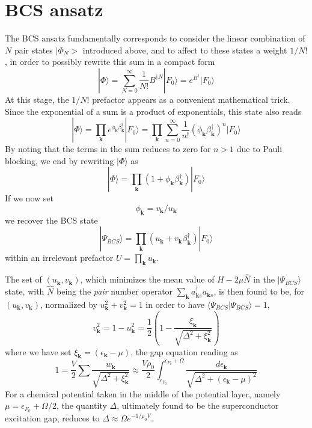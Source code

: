 \documentclass[aps,prb,preprint,groupedaddress,amsmath]{revtex4-1}
\newcommand{\vk}{\ensuremath{\mathbf{k}}}
\newcommand{\dg}{\ensuremath{\dagger}}
\begin{document}
\section{BCS  ansatz\label{sec:bcs}}
The BCS ansatz fundamentally corresponds to consider the linear combination of $N$ pair states $|\Phi_N>$ introduced above, and to affect to these states a weight $1/N!$, in order to possibly rewrite this sum in a compact form
\begin{equation}
|\Phi{\rangle}=\sum^\infty_{N=0}\frac{1}{N!}B^{\dg{}N}|F_0{\rangle}=e^{B^\dg}|F_0{\rangle}
\label{eq:BcsPhi}
\end{equation}
At this stage, the $1/N!$ prefactor appears as a convenient mathematical trick. Since the exponential of a sum is a product of exponentials, this state also reads 
\begin{equation}
|\Phi{\rangle}=\prod_\vk{}e^{\phi_\vk\beta^\dg_\vk}|F_0{\rangle}=\prod_\vk{}\sum_{n=0}^\infty\frac{1}{n!}({\phi_\vk\beta^\dg_\vk})^n|F_0{\rangle}
\label{eq:BcsPhi2}
\end{equation}
By noting that the terms in the sum reduces to zero for $n>1$ due to Pauli blocking, we end by rewriting $|\Phi\rangle$ as 
\begin{equation}
|\Phi{\rangle}=\prod_\vk{}({1+\phi_\vk\beta^\dg_\vk})|F_0{\rangle}
\label{eq:BcsPhi3}
\end{equation}
If we now set 
\begin{equation}\label{eq:phiUv}
\phi_\vk=v_\vk/u_\vk
\end{equation}
 we recover the  BCS state
\begin{equation}
|\Psi_{BCS}{\rangle}=\prod_\vk{}({u_\vk+v_\vk\beta^\dg_\vk})|F_0{\rangle}
\label{eq:Bcs1}
\end{equation}
within an irrelevant prefactor $U=\prod_\vk{u_\vk}$.  

The set of $(u_\vk,v_\vk)$,  which minimizes the mean value of   $H-2\mu\hat{N}$ in the $|\Psi_{BCS}\rangle$ state, with $\hat{N}$ being the \emph{pair} number operator $\sum_\vk{}a^\dg_{\vk{}s}a^{}_{\vk{}s}$,  is then found to be, for   $(u_\vk,v_\vk)$, normalized by $u_\vk^2+v_\vk^2=1$ in order to have $\langle\Psi_{BCS}|\Psi_{BCS}\rangle=1$,
\begin{equation}\label{eq:v}
v^2_\vk=1-u_\vk^2=\frac{1}{2}\left(1-\frac{\xi_\vk}{\sqrt{\Delta^2+\xi_\vk^2}}\right)
\end{equation}
where we have set $\xi_\vk=(\epsilon_\vk-\mu)$, the gap equation reading as
\begin{equation}
1=\frac{V}{2}\sum\frac{w_\vk}{\sqrt{\Delta^2+\xi_\vk^2}}\approx%
	\frac{V\rho_0}{2}\int_{\epsilon_{F_0}}^{\epsilon_{F_0}+\Omega}%
	\frac{d\epsilon_\vk}{\sqrt{\Delta^2+(\epsilon_\vk-\mu)^2}}
\end{equation}
For a chemical potential taken in the middle of the potential layer, namely $\mu=\epsilon_{F_0}+\Omega/2$, the quantity $\Delta$, ultimately found to be the superconductor excitation gap, reduces to  $\Delta\approx\Omega{}e^{-1/\rho_0V}$.
\end{document}

